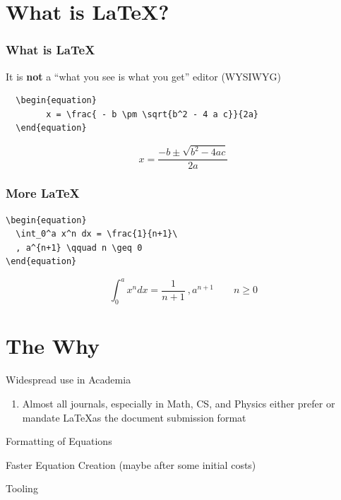 \documentclass{beamer}
\begin{document}
\section{What is \LaTeX?}

\begin{frame}[fragile]
  \frametitle{What is \LaTeX}

  It is \textbf{not} a ``what you see is what you get'' editor (WYSIWYG)

\begin{verbatim}
  \begin{equation}
        x = \frac{ - b \pm \sqrt{b^2 - 4 a c}}{2a}
  \end{equation}
\end{verbatim}
\par
  \hrulefill\par
  \begin{equation}
        x = \frac{ - b \pm \sqrt{b^2 - 4 a c}}{2a}
  \end{equation}

\end{frame}

\begin{frame}[fragile]
\frametitle{More LaTeX}
\begin{verbatim}
\begin{equation}
  \int_0^a x^n dx = \frac{1}{n+1}\
  , a^{n+1} \qquad n \geq 0
\end{equation}
\end{verbatim}

\begin{equation}
  \int_0^a x^n dx = \frac{1}{n+1}\
  , a^{n+1} \qquad n \geq 0
\end{equation}

\end{frame}

\section{The Why}


\begin{frame}{Widespread use in Academia}

  \begin{enumerate}
    \item {Almost all journals, especially in Math, CS, and Physics
      either prefer or mandate \LaTeX as the document submission
      format}
   \end{enumerate}

\vskip 1cm

\end{frame}

\begin{frame}{Formatting of Equations}


\vskip 1cm

\end{frame}

\begin{frame}{Faster Equation Creation (maybe after some initial costs)}


\end{frame}

\begin{frame}{Tooling}

\end{frame}
\end{document}
